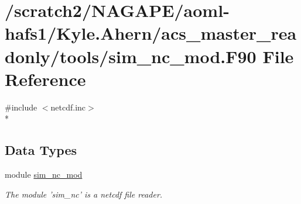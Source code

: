 \section{/scratch2/\-N\-A\-G\-A\-P\-E/aoml-\/hafs1/\-Kyle.Ahern/acs\-\_\-master\-\_\-readonly/tools/sim\-\_\-nc\-\_\-mod.F90 File Reference}
\label{sim__nc__mod_8F90}
{\ttfamily \#include $<$netcdf.\-inc$>$}\\*
\subsection*{Data Types}
\begin{DoxyCompactItemize}
\item 
module \hyperlink{classsim__nc__mod}{sim\-\_\-nc\-\_\-mod}
\begin{DoxyCompactList}\small\item\em The module 'sim\-\_\-nc' is a netcdf file reader. \end{DoxyCompactList}\end{DoxyCompactItemize}
